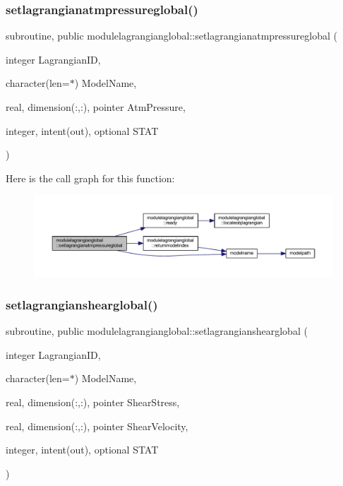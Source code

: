 \subsubsection{\texorpdfstring{setlagrangianatmpressureglobal()}{setlagrangianatmpressureglobal()}}
{\footnotesize\ttfamily subroutine, public modulelagrangianglobal\+::setlagrangianatmpressureglobal (\begin{DoxyParamCaption}\item[{integer}]{Lagrangian\+ID,  }\item[{character(len=$\ast$)}]{Model\+Name,  }\item[{real, dimension(\+:,\+:), pointer}]{Atm\+Pressure,  }\item[{integer, intent(out), optional}]{S\+T\+AT }\end{DoxyParamCaption})}

Here is the call graph for this function\+:\nopagebreak
\begin{figure}[H]
\begin{center}
\leavevmode
\includegraphics[width=350pt]{namespacemodulelagrangianglobal_a98a63aa4ad8e0057fcd9682992e94c72_cgraph}
\end{center}
\end{figure}
\mbox{\label{namespacemodulelagrangianglobal_adc48b1a085b61254391390b4d5e28fa0}} 
\subsubsection{\texorpdfstring{setlagrangianshearglobal()}{setlagrangianshearglobal()}}
{\footnotesize\ttfamily subroutine, public modulelagrangianglobal\+::setlagrangianshearglobal (\begin{DoxyParamCaption}\item[{integer}]{Lagrangian\+ID,  }\item[{character(len=$\ast$)}]{Model\+Name,  }\item[{real, dimension(\+:,\+:), pointer}]{Shear\+Stress,  }\item[{real, dimension(\+:,\+:), pointer}]{Shear\+Velocity,  }\item[{integer, intent(out), optional}]{S\+T\+AT }\end{DoxyParamCaption})}


